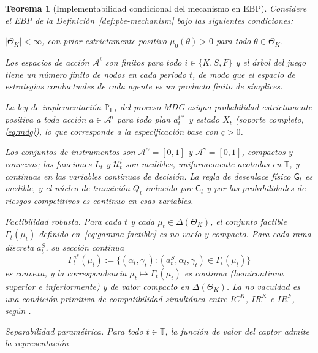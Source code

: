 \documentclass[review,authoryear,12pt]{elsarticle}
\theoremstyle{plain}
\newtheorem{theorem}{Teorema}
\theoremstyle{definition}
\newcommand{\ThetaK}{\Theta_K}
\newcommand{\1}{\mathbf{1}}
\newcommand{\ProbI}[1]{\mathbb{P}_{\mathrm{I},#1}}
\begin{document}
\begin{theorem}[Implementabilidad condicional del mecanismo en EBP]\label{thm:ebp-implementabilidad}
\normalfont
Considere el EBP de la Definición~\ref{def:pbe-mechanism} bajo las siguientes condiciones:
\begin{list}{}{\setlength{\labelwidth}{2.6em}\setlength{\labelsep}{0.7em}\setlength{\leftmargin}{3.3em}\setlength{\itemindent}{0pt}\setlength{\listparindent}{0pt}\setlength{\parsep}{0pt}\setlength{\itemsep}{0.35\baselineskip}}
  \item[\textup{(i)}] $|\ThetaK|<\infty$, con prior estrictamente positivo $\mu_0(\theta)>0$ para todo $\theta\in\ThetaK$.
  \item[\textup{(ii)}] Los espacios de acción $\mathcal{A}^i$ son finitos para todo $i\in\{K,S,F\}$ y el árbol del juego tiene un número finito de nodos en cada período $t$, de modo que el espacio de estrategias conductuales de cada agente es un producto finito de símplices.
  \item[\textup{(iii)}] La ley de implementación $\ProbI{i}$ del proceso MDG asigna probabilidad estrictamente positiva a toda acción $a\in\mathcal{A}^i$ para todo plan $a_t^{i\ast}$ y estado $X_t$ \textup{(}soporte completo, \eqref{eq:mdg}\textup{)}, lo que corresponde a la especificación base con $\underline{c}>0$.
  \item[\textup{(iv)}] Los conjuntos de instrumentos son $\mathcal{A}^{\alpha}=[0,1]$ y $\mathcal{A}^{\gamma}=[0,1]$, compactos y convexos; las funciones $L_t$ y $\mathcal{U}_t^i$ son medibles, uniformemente acotadas en $\mathbb{T}$, y continuas en las variables continuas de decisión. La regla de desenlace físico $\mathsf{G}_t$ es medible, y el núcleo de transición $Q_t$ inducido por $\mathsf{G}_t$ y por las probabilidades de riesgos competitivos es continuo en esas variables.
  \item[\textup{(v)}] Factibilidad robusta. Para cada $t$ y cada $\mu_t\in\Delta(\ThetaK)$, el conjunto factible $\Gamma_t(\mu_t)$ definido en~\eqref{eq:gamma-factible} es no vacío y compacto. Para cada rama discreta $a_t^S$, su sección continua
  \[
  \Gamma_t^{a^S}(\mu_t):=\{(\alpha_t,\gamma_t):(a_t^S,\alpha_t,\gamma_t)\in\Gamma_t(\mu_t)\}
  \]
  es convexa, y la correspondencia $\mu_t\mapsto\Gamma_t(\mu_t)$ es continua \textup{(}hemicontinua superior e inferiormente\textup{)} y de valor compacto en $\Delta(\ThetaK)$. La no vacuidad es una condición primitiva de compatibilidad simultánea entre $IC^K$, $IR^K$ e $IR^F$, según \citet{KadanRenySwinkels2017}.
  \item[\textup{(vi)}] Separabilidad paramétrica. Para todo $t\in\mathbb{T}$, la función de valor del captor admite la representación

\end{list}
\end{theorem}
\end{document}
